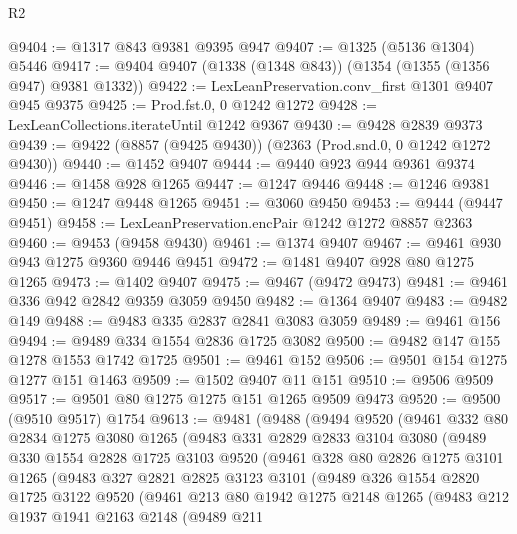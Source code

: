 \begin{lexlean}{R2}
\begin{coremodule}
@9404 := @1317 @843 @9381 @9395 @947
@9407 := @1325 (@5136 @1304) @5446
@9417 := @9404 @9407 (@1338 (@1348 @843)) (@1354 (@1355 (@1356 @947) @9381 @1332))
@9422 := LexLeanPreservation.conv_first @1301 @9407 @945 @9375
@9425 := Prod.fst.{0, 0} @1242 @1272
@9428 := LexLeanCollections.iterateUntil @1242 @9367
@9430 := @9428 @2839 @9373
@9439 := @9422 (@8857 (@9425 @9430)) (@2363 (Prod.snd.{0, 0} @1242 @1272 @9430))
@9440 := @1452 @9407
@9444 := @9440 @923 @944 @9361 @9374
@9446 := @1458 @928 @1265
@9447 := @1247 @9446
@9448 := @1246 @9381
@9450 := @1247 @9448 @1265
@9451 := @3060 @9450
@9453 := @9444 (@9447 @9451)
@9458 := LexLeanPreservation.encPair @1242 @1272 @8857 @2363
@9460 := @9453 (@9458 @9430)
@9461 := @1374 @9407
@9467 := @9461 @930 @943 @1275 @9360 @9446 @9451
@9472 := @1481 @9407 @928 @80 @1275 @1265
@9473 := @1402 @9407
@9475 := @9467 (@9472 @9473)
@9481 := @9461 @336 @942 @2842 @9359 @3059 @9450
@9482 := @1364 @9407
@9483 := @9482 @149
@9488 := @9483 @335 @2837 @2841 @3083 @3059
@9489 := @9461 @156
@9494 := @9489 @334 @1554 @2836 @1725 @3082
@9500 := @9482 @147 @155 @1278 @1553 @1742 @1725
@9501 := @9461 @152
@9506 := @9501 @154 @1275 @1277 @151 @1463
@9509 := @1502 @9407 @11 @151
@9510 := @9506 @9509
@9517 := @9501 @80 @1275 @1275 @151 @1265 @9509 @9473
@9520 := @9500 (@9510 @9517) @1754
@9613 := @9481
    (@9488
      (@9494
        @9520
        (@9461
          @332
          @80
          @2834
          @1275
          @3080
          @1265
          (@9483
            @331
            @2829
            @2833
            @3104
            @3080
            (@9489
              @330
              @1554
              @2828
              @1725
              @3103
              @9520
              (@9461
                @328
                @80
                @2826
                @1275
                @3101
                @1265
                (@9483
                  @327
                  @2821
                  @2825
                  @3123
                  @3101
                  (@9489
                    @326
                    @1554
                    @2820
                    @1725
                    @3122
                    @9520
                    (@9461
                      @213
                      @80
                      @1942
                      @1275
                      @2148
                      @1265
                      (@9483
                        @212
                        @1937
                        @1941
                        @2163
                        @2148
                        (@9489
                          @211

\end{coremodule}
\end{lexlean}
